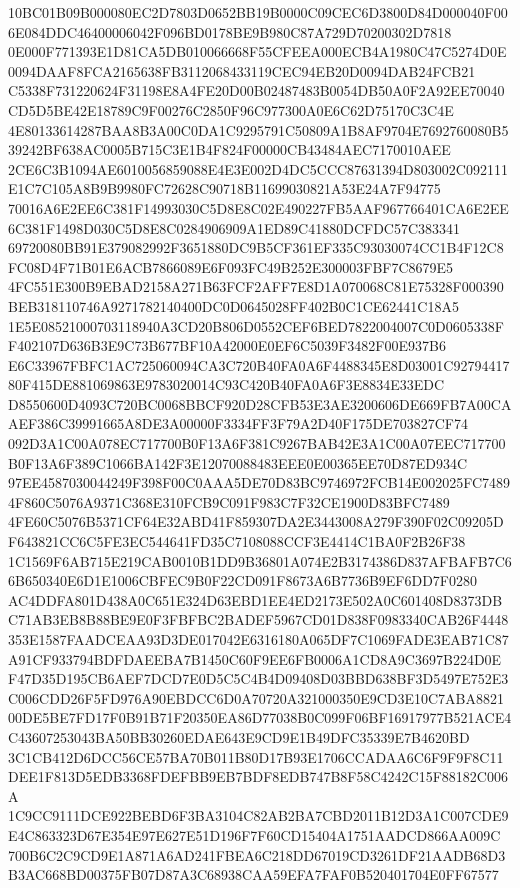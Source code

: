 \documentclass[UTF8,fontset=fandol,zihao=-4,a4paper]{ctexart}
\begin{document}
{{10BC01B09B000080EC2D7803D0652BB19B0000C09CEC6D3800D84D000040F006E084DDC46400006042F096BD0178BE9B980C87A729D70200302D7818
0E000F771393E1D81CA5DB010066668F55CFEEA000ECB4A1980C47C5274D0E0094DAAF8FCA2165638FB3112068433119CEC94EB20D0094DAB24FCB21
C5338F731220624F31198E8A4FE20D00B02487483B0054DB50A0F2A92EE70040CD5D5BE42E18789C9F00276C2850F96C977300A0E6C62D75170C3C4E
4E80133614287BAA8B3A00C0DA1C9295791C50809A1B8AF9704E7692760080B539242BF638AC0005B715C3E1B4F824F00000CB43484AEC7170010AEE
2CE6C3B1094AE6010056859088E4E3E002D4DC5CCC87631394D803002C092111E1C7C105A8B9B9980FC72628C90718B11699030821A53E24A7F94775
70016A6E2EE6C381F14993030C5D8E8C02E490227FB5AAF967766401CA6E2EE6C381F1498D030C5D8E8C0284906909A1ED89C41880DCFDC57C383341
69720080BB91E379082992F3651880DC9B5CF361EF335C93030074CC1B4F12C8FC08D4F71B01E6ACB7866089E6F093FC49B252E300003FBF7C8679E5
4FC551E300B9EBAD2158A271B63FCF2AFF7E8D1A070068C81E75328F000390BEB318110746A9271782140400DC0D0645028FF402B0C1CE62441C18A5
1E5E08521000703118940A3CD20B806D0552CEF6BED7822004007C0D0605338FF402107D636B3E9C73B677BF10A42000E0EF6C5039F3482F00E937B6
E6C33967FBFC1AC725060094CA3C720B40FA0A6F4488345E8D03001C9279441780F415DE881069863E9783020014C93C420B40FA0A6F3E8834E33EDC
D8550600D4093C720BC0068BBCF920D28CFB53E3AE3200606DE669FB7A00CAAEF386C39991665A8DE3A00000F3334FF3F79A2D40F175DE703827CF74
092D3A1C00A078EC717700B0F13A6F381C9267BAB42E3A1C00A07EEC717700B0F13A6F389C1066BA142F3E12070088483EEE0E00365EE70D87ED934C
97EE4587030044249F398F00C0AAA5DE70D83BC9746972FCB14E002025FC74894F860C5076A9371C368E310FCB9C091F983C7F32CE1900D83BFC7489
4FE60C5076B5371CF64E32ABD41F859307DA2E3443008A279F390F02C09205DF643821CC6C5FE3EC544641FD35C7108088CCF3E4414C1BA0F2B26F38
1C1569F6AB715E219CAB0010B1DD9B36801A074E2B3174386D837AFBAFB7C66B650340E6D1E1006CBFEC9B0F22CD091F8673A6B7736B9EF6DD7F0280
AC4DDFA801D438A0C651E324D63EBD1EE4ED2173E502A0C601408D8373DBC71AB3EB8B88BE9E0F3FBFBC2BADEF5967CD01D838F0983340CAB26F4448
353E1587FAADCEAA93D3DE017042E6316180A065DF7C1069FADE3EAB71C87A91CF933794BDFDAEEBA7B1450C60F9EE6FB0006A1CD8A9C3697B224D0E
F47D35D195CB6AEF7DCD7E0D5C5C4B4D09408D03BBD638BF3D5497E752E3C006CDD26F5FD976A90EBDCC6D0A70720A321000350E9CD3E10C7ABA8821
00DE5BE7FD17F0B91B71F20350EA86D77038B0C099F06BF16917977B521ACE4C43607253043BA50BB30260EDAE643E9CD9E1B49DFC35339E7B4620BD
3C1CB412D6DCC56CE57BA70B011B80D17B93E1706CCADAA6C6F9F9F8C11DEE1F813D5EDB3368FDEFBB9EB7BDF8EDB747B8F58C4242C15F88182C006A
1C9CC9111DCE922BEBD6F3BA3104C82AB2BA7CBD2011B12D3A1C007CDE9E4C863323D67E354E97E627E51D196F7F60CD15404A1751AADCD866AA009C
700B6C2C9CD9E1A871A6AD241FBEA6C218DD67019CD3261DF21AADB68D3B3AC668BD00375FB07D87A3C68938CAA59EFA7FAF0B520401704E0FF67577
}}
\end{document}
